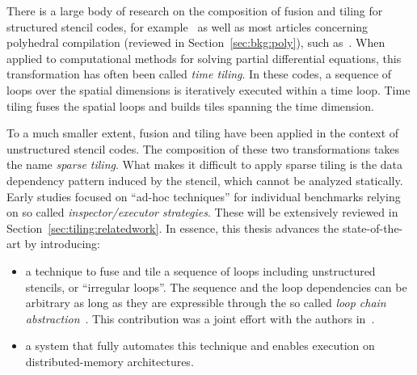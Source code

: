 There is a large body of research on the composition of fusion and tiling for structured stencil codes, for example~\cite{cohen-timetiling,ics-stencil-tiling,Zhou12} as well as most articles concerning polyhedral compilation (reviewed in Section~\ref{sec:bkg:poly}), such as~\cite{pluto}. When applied to computational methods for solving partial differential equations, this transformation has often been called {\em time tiling}. In these codes, a sequence of loops over the spatial dimensions is iteratively executed within a time loop. Time tiling fuses the spatial loops and builds tiles spanning the time dimension.

To a much smaller extent, fusion and tiling have been applied in the context of unstructured stencil codes. The composition of these two transformations takes the name {\em sparse tiling}. What makes it difficult to apply sparse tiling is the data dependency pattern induced by the stencil, which cannot be analyzed statically. Early studies focused on ``ad-hoc techniques'' for individual benchmarks relying on so called {\em inspector/executor strategies}. These will be extensively reviewed in Section~\ref{sec:tiling:relatedwork}. In essence, this thesis advances the state-of-the-art by introducing:
\begin{itemize}
\item a technique to fuse and tile a sequence of loops including unstructured stencils, or ``irregular loops''. The sequence and the loop dependencies can be arbitrary as long as they are expressible through the so called {\em loop chain abstraction}~\cite{ST-KriegerHIPS2013}. This contribution was a joint effort with the authors in~\cite{st-paper}.
\item a system that fully automates this technique and enables execution on distributed-memory architectures.
\end{itemize}
 
